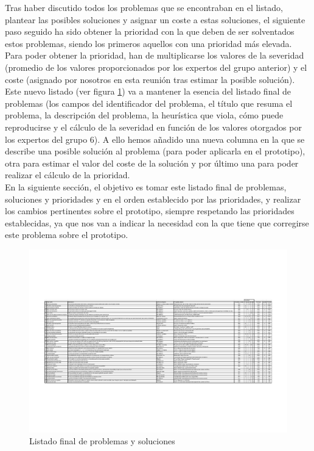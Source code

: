 Tras haber discutido todos los problemas que se encontraban en el listado, plantear las posibles soluciones y asignar un coste a estas soluciones, el siguiente paso seguido
ha sido obtener la prioridad con la que deben de ser solventados estos problemas, siendo los primeros aquellos con una prioridad más elevada. Para poder obtener la prioridad,
han de multiplicarse los valores de la severidad (promedio de los valores proporcionados por los expertos del grupo anterior) y el coste (asignado por nosotros en esta reunión
tras estimar la posible solución). \\

Este nuevo listado (ver figura \ref{fig:list-prob-sol}) va a mantener la esencia del listado final de problemas (los campos del identificador del problema, el título que resuma el problema, la descripción del problema,
la heurística que viola, cómo puede reproducirse y el cálculo de la severidad en función de los valores otorgados por los expertos del grupo 6). A ello hemos añadido una nueva columna
en la que se describe una posible solución al problema (para poder aplicarla en el prototipo), otra para estimar el valor del coste de la solución y por último una para poder
realizar el cálculo de la prioridad. \\

En la siguiente sección, el objetivo es tomar este listado final de problemas, soluciones y prioridades y en el orden establecido por las prioridades, y realizar los cambios pertinentes sobre
el prototipo, siempre respetando las prioridades establecidas, ya que nos van a indicar la necesidad con la que tiene que corregirse este problema sobre el prototipo.
\begin{figure}[H]
    \centering
    \includegraphics[angle=270,width=1.\textwidth]{Imagenes/Hito6/Lista final de problemas, soluciones y prioridades.pdf}
    \caption{Listado final de problemas y soluciones}
    \label{fig:list-prob-sol}
\end{figure}

